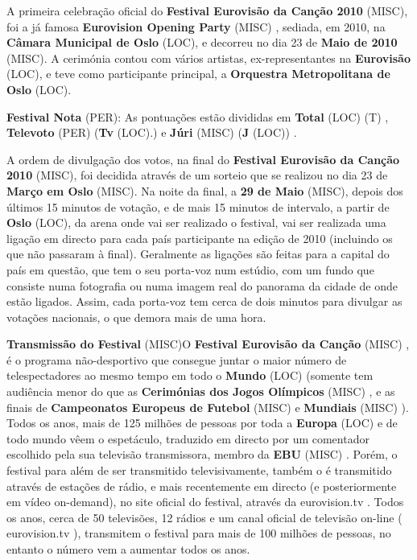 \documentclass[12pt,a4paper]{article}
\begin{document}
A primeira celebração oficial do \textbf{Festival Eurovisão da Canção 2010} (MISC), foi a já famosa \textbf{Eurovision Opening Party} (MISC) , sediada, em 2010, na \textbf{Câmara Municipal de Oslo} (LOC), e decorreu no dia 23 de \textbf{Maio de 2010} (MISC). A cerimónia contou com vários artistas, ex-representantes na \textbf{Eurovisão} (LOC), e teve como participante principal, a \textbf{Orquestra Metropolitana de Oslo} (LOC).



\textbf{Festival Nota} (PER): As pontuações estão divididas em \textbf{Total} (LOC) (T) , \textbf{Televoto} (PER) (\textbf{Tv} (LOC).) e \textbf{Júri} (MISC) (\textbf{J} (LOC)) .

A ordem de divulgação dos votos, na final do \textbf{Festival Eurovisão da Canção 2010} (MISC), foi decidida através de um sorteio que se realizou no dia 23 de \textbf{Março em Oslo} (MISC). Na noite da final, a \textbf{29 de Maio} (MISC), depois dos últimos 15 minutos de votação, e de mais 15 minutos de intervalo, a partir de \textbf{Oslo} (LOC), da arena onde vai ser realizado o festival, vai ser realizada uma ligação em directo para cada país participante na edição de 2010 (incluindo os que não passaram à final). Geralmente as ligações são feitas para a capital do país em questão, que tem o seu porta-voz num estúdio, com um fundo que consiste numa fotografia ou numa imagem real do panorama da cidade de onde estão ligados. Assim, cada porta-voz tem cerca de dois minutos para divulgar as votações nacionais, o que demora mais de uma hora.



\textbf{Transmissão do Festival} (MISC)O \textbf{Festival Eurovisão da Canção} (MISC) , é o programa não-desportivo que consegue juntar o maior número de telespectadores ao mesmo tempo em todo o \textbf{Mundo} (LOC) (somente tem audiência menor do que as \textbf{Cerimónias dos Jogos Olímpicos} (MISC) , e as finais de \textbf{Campeonatos Europeus de Futebol} (MISC) e \textbf{Mundiais} (MISC) ). Todos os anos, mais de 125 milhões de pessoas por toda a \textbf{Europa} (LOC) e de todo mundo vêem o espetáculo, traduzido em directo por um comentador escolhido pela sua televisão transmissora, membro da \textbf{EBU} (MISC) . Porém, o festival para além de ser transmitido televisivamente, também o é transmitido através de estações de rádio, e mais recentemente em directo (e posteriormente em vídeo on-demand), no site oficial do festival, através da eurovision.tv . Todos os anos, cerca de 50 televisões, 12 rádios e um canal oficial de televisão on-line ( eurovision.tv ), transmitem o festival para mais de 100 milhões de pessoas, no entanto o número vem a aumentar todos os anos.
\end{document}
